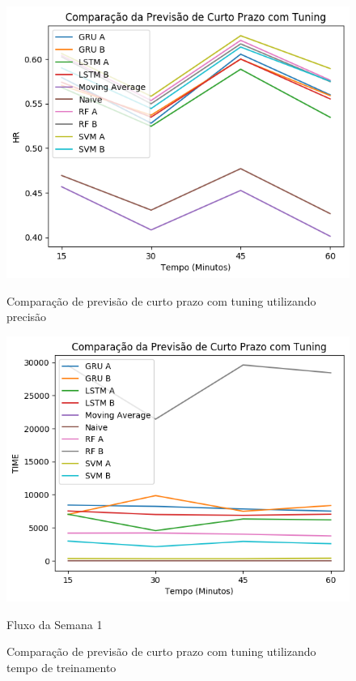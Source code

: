 \begin{figure}[htbp]
    \centering
    \includegraphics[scale=0.8]{monography/img/comparisons/comparacao_da_previsao_de_curto_prazo_com_tuning_hr.png}
    \label{figure:previsao_de_curto_prazo_com_tuning_hr}
    \caption{Comparação de previsão de curto prazo com tuning utilizando precisão}
\end{figure}

\begin{figure}[htbp]
    \centering
    \includegraphics[scale=0.8]{monography/img/comparisons/comparacao_da_previsao_de_curto_prazo_com_tuning_time.png}
    \label{figure:previsao_de_curto_prazo_com_tuning_time}
    \caption{Fluxo da Semana 1}
    \caption{Comparação de previsão de curto prazo com tuning utilizando tempo de treinamento}
\end{figure}

